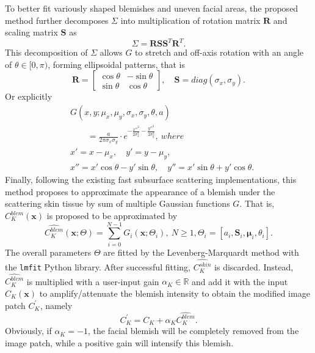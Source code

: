\begin{spacing}{1.5}
To better fit variously shaped blemishes and uneven facial areas, the proposed method further decomposes $\Sigma$ into multiplication of rotation matrix $\mathbf{R}$ and scaling matrix $\mathbf{S}$ as
\begin{equation}
    \Sigma= \mathbf{R}\mathbf{S}\mathbf{S}^T\mathbf{R}^T.
\end{equation}
This decomposition of $\Sigma$ allows $G$ to stretch and off-axis rotation with an angle of $\theta\in[0,\pi)$, forming ellipsoidal patterns, that is
\begin{equation}
  \mathbf{R} = \begin{bmatrix}
    \cos\theta & -\sin\theta \\
    \sin\theta & \cos\theta
  \end{bmatrix},\quad\mathbf{S}=diag(\sigma_x,\sigma_y).
\end{equation}
Or explicitly
\begin{equation}
    \begin{aligned}
         & G(x, y; \mu_x, \mu_y, \sigma_x, \sigma_y, \theta, a)\\
         & \qquad=\frac{a}{2\pi \sigma_x \sigma_y}\cdot e^{-\frac{{x''^2}}{{2 \sigma_x^2}} - \frac{{y''^2}}{{2 \sigma_y^2}}},\ where \\
         & x'=x - \mu_x, \quad y'=y - \mu_y, \\
         & x'' = x' \cos\theta - y' \sin\theta,\quad y'' = x' \sin\theta + y' \cos\theta.
    \end{aligned}
\end{equation}
Finally, following the existing fast subsurface scattering implementations\cite{10.1145/1073204.1073308, d2007efficient}, this method proposes to approximate the appearance of a blemish under the scattering skin tissue by sum of multiple Gaussian functions $G$. That is, $C_K^{blem}(\mathbf{x})$ is proposed to be approximated by
\begin{equation}
  \hat{C_K^{blem}}(\mathbf{x}; \Theta)=\sum_{i=0}^{N-1}G_i(\mathbf{x}; \Theta_i),\ N\ge1, \Theta_i=\left[a_i, \mathbf{S}_i, \mathbf{\mu}_i, \theta_i\right].
\end{equation}
The overall parameters $\Theta$ are fitted by the Levenberg-Marquardt method\cite{10.1007/BFb0067700} with the \texttt{lmfit} Python library\cite{newville_matthew_2014_11813}. After successful fitting, $\hat{C_K^{skin}}$ is discarded. Instead, $\hat{C_K^{blem}}$ is multiplied with a user-input gain $\alpha_K\in\mathbb{R}$ and add it with the input $C_K(\mathbf{x})$ to amplify/attenuate the blemish intensity to obtain the modified image patch $C_K^{\prime}$, namely
\begin{equation}
  C_K^{\prime} = C_K+\alpha_K\hat{C_K^{blem}}.
  \label{eqn:alpha}
\end{equation}
Obviously, if $\alpha_K=-1$, the facial blemish will be completely removed from the image patch, while a positive gain will intensify this blemish.


\end{spacing}
